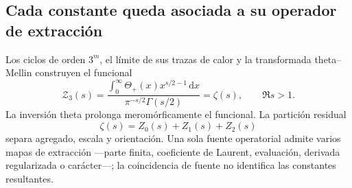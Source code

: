 \subsection{Cada constante queda asociada a su operador de extracci\'on}

Los ciclos de orden \(3^m\), el l\'imite de sus trazas de calor y la
transformada theta--Mellin construyen el funcional
\begin{equation}
 \mathcal Z_3(s)
 =\frac{\displaystyle
 \int_0^\infty\Theta_+(x)x^{s/2-1}\,\mathrm dx}
 {\pi^{-s/2}\Gamma(s/2)}
 =\zeta(s),
 \qquad \Re s>1.
 \label{p3-83-c44-s1:eq:funcional-triadico-resumen-rev11}
\end{equation}
La inversi\'on theta prolonga merom\'orficamente el funcional. La partici\'on
residual
\[
 \zeta(s)=Z_0(s)+Z_1(s)+Z_2(s)
\]
separa agregado, escala y orientaci\'on. Una sola fuente operatorial admite
varios mapas de extracci\'on ---parte finita, coeficiente de Laurent,
evaluaci\'on, derivada regularizada o car\'acter---; la coincidencia de fuente
no identifica las constantes resultantes.

